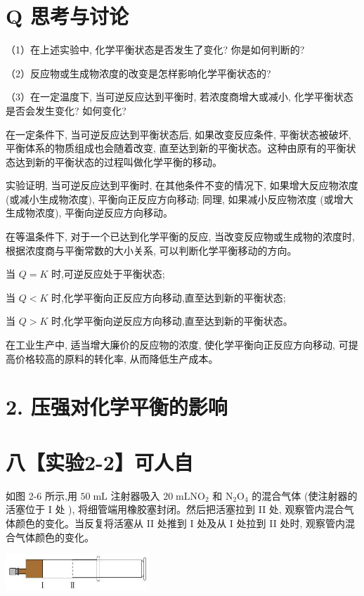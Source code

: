 \documentclass[10pt]{article}
\begin{document}
\section*{Q 思考与讨论}

（1）在上述实验中, 化学平衡状态是否发生了变化? 你是如何判断的?

（2）反应物或生成物浓度的改变是怎样影响化学平衡状态的?

（3）在一定温度下, 当可逆反应达到平衡时, 若浓度商增大或减小, 化学平衡状态是否会发生变化? 如何变化?

在一定条件下, 当可逆反应达到平衡状态后, 如果改变反应条件, 平衡状态被破坏, 平衡体系的物质组成也会随着改变, 直至达到新的平衡状态。这种由原有的平衡状态达到新的平衡状态的过程叫做化学平衡的移动。

实验证明, 当可逆反应达到平衡时, 在其他条件不变的情况下, 如果增大反应物浓度 (或减小生成物浓度), 平衡向正反应方向移动; 同理, 如果减小反应物浓度 (或增大生成物浓度), 平衡向逆反应方向移动。

在等温条件下, 对于一个已达到化学平衡的反应, 当改变反应物或生成物的浓度时, 根据浓度商与平衡常数的大小关系, 可以判断化学平衡移动的方向。

当 \(Q = K\) 时,可逆反应处于平衡状态;

当 \(Q < K\) 时,化学平衡向正反应方向移动,直至达到新的平衡状态;

当 \(Q > K\) 时,化学平衡向逆反应方向移动,直至达到新的平衡状态。

在工业生产中, 适当增大廉价的反应物的浓度, 使化学平衡向正反应方向移动, 可提高价格较高的原料的转化率, 从而降低生产成本。

\section*{2. 压强对化学平衡的影响}

\section*{八【实验2-2】可人自}

如图 2-6 所示,用 \({50}\mathrm{\;{mL}}\) 注射器吸入 \({20}\mathrm{\;{mL}}{\mathrm{{NO}}}_{2}\) 和 \({\mathrm{N}}_{2}{\mathrm{O}}_{4}\) 的混合气体 (使注射器的活塞位于 I 处 ), 将细管端用橡胶塞封闭。然后把活塞拉到 II 处, 观察管内混合气体颜色的变化。当反复将活塞从 II 处推到 I 处及从 I 处拉到 II 处时, 观察管内混合气体颜色的变化。

\begin{center}
\includegraphics[max width=0.4\textwidth]{images/0190da9d-8bfd-732f-bc2c-0b21d0f13b91_43_996396.jpg}
\end{center}
\end{document}

